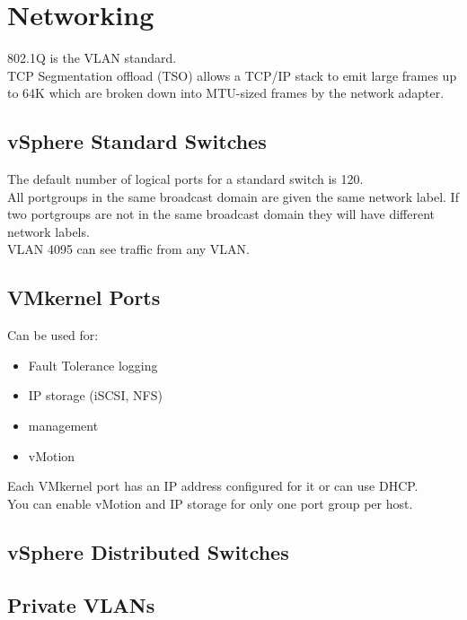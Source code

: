 \documentclass{article}
\begin{document}
\section{Networking}

802.1Q is the VLAN standard.\\

TCP Segmentation offload (TSO) allows a TCP/IP stack to emit large frames
up to 64K which are broken down into MTU-sized frames by the network adapter.

\subsection{vSphere Standard Switches}

The default number of logical ports for a standard switch is 120.\\

All portgroups in the same broadcast domain are given the same network label.
If two portgroups are not in the same broadcast domain they will have different
network labels.\\

VLAN 4095 can see traffic from any VLAN.

\subsection{VMkernel Ports}

Can be used for:

\begin{itemize}
\item Fault Tolerance logging
\item IP storage (iSCSI, NFS)
\item management
\item vMotion
\end{itemize}

Each VMkernel port has an IP address configured for it or can use DHCP.\\

You can enable vMotion and IP storage for only one port group per host.

\subsection{vSphere Distributed Switches}

\subsection{Private VLANs}
\end{document}
